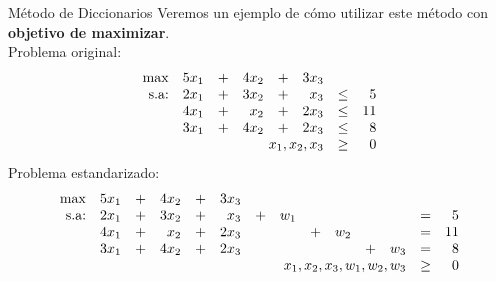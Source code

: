 \documentclass[10pt, aspectratio=169]{beamer}
\begin{document}
    \begin{frame}{Método de Diccionarios}
        Veremos un ejemplo de cómo utilizar este método con \textbf{objetivo de maximizar}.
        \\
        Problema original:
        \[
            \begin{array}{rrrrrrrr}
                \max & 5x_1 & + & 4x_2 & + & 3x_3 & \\
                \text{s.a:} & 2x_1 & + & 3x_2 & + & x_3  & \leq & 5  \\
                & 4x_1 & + & x_2  & + & 2x_3 & \leq & 11 \\
                & 3x_1 & + & 4x_2 & + & 2x_3 & \leq & 8  \\
                & \multicolumn{5}{r}{x_1,x_2,x_3} & \geq & 0 \\
            \end{array}
        \]
        Problema estandarizado: \pause
        \vspace{0.1cm}
        \[
            \begin{array}{rrrrrrrrrrrrrr}
                \max & 5x_1 & + & 4x_2 & + & 3x_3 & \\
                \text{s.a:} & 2x_1 & + & 3x_2 & + & x_3  & + & w_1 &   &     &   &     & = & 5  \\
                & 4x_1 & + & x_2  & + & 2x_3 &   &     & + & w_2 &   &     & = & 11 \\
                & 3x_1 & + & 4x_2 & + & 2x_3 &   &     &   &     & + & w_3 & = & 8  \\
                & \multicolumn{11}{r}{x_1,x_2,x_3,w_1,w_2,w_3} & \geq & 0 \\
            \end{array}\]
    \end{frame}
\end{document}
